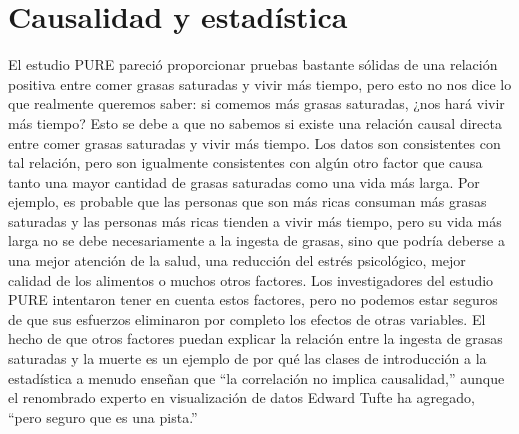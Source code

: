 \documentclass[
  12pt,
]{book}
\theoremstyle{definition}
\theoremstyle{definition}
\theoremstyle{definition}
\theoremstyle{remark}
\begin{document}
\hypertarget{causalidad-y-estaduxedstica}{%
\section{Causalidad y estadística}\label{causalidad-y-estaduxedstica}}

El estudio PURE pareció proporcionar pruebas bastante sólidas de una relación positiva entre comer grasas saturadas y vivir más tiempo, pero esto no nos dice lo que realmente queremos saber: si comemos más grasas saturadas, ¿nos hará vivir más tiempo? Esto se debe a que no sabemos si existe una relación causal directa entre comer grasas saturadas y vivir más tiempo. Los datos son consistentes con tal relación, pero son igualmente consistentes con algún otro factor que causa tanto una mayor cantidad de grasas saturadas como una vida más larga. Por ejemplo, es probable que las personas que son más ricas consuman más grasas saturadas y las personas más ricas tienden a vivir más tiempo, pero su vida más larga no se debe necesariamente a la ingesta de grasas, sino que podría deberse a una mejor atención de la salud, una reducción del estrés psicológico, mejor calidad de los alimentos o muchos otros factores. Los investigadores del estudio PURE intentaron tener en cuenta estos factores, pero no podemos estar seguros de que sus esfuerzos eliminaron por completo los efectos de otras variables. El hecho de que otros factores puedan explicar la relación entre la ingesta de grasas saturadas y la muerte es un ejemplo de por qué las clases de introducción a la estadística a menudo enseñan que ``la correlación no implica causalidad,'' aunque el renombrado experto en visualización de datos Edward Tufte ha agregado, ``pero seguro que es una pista.''
\end{document}
